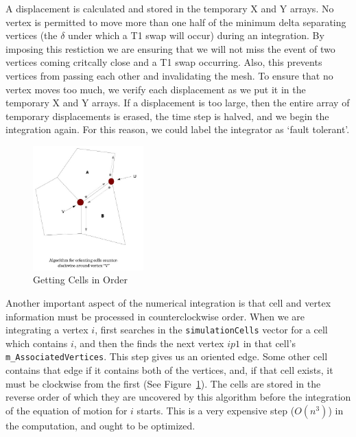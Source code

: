 A displacement is calculated and stored in the temporary X and Y arrays. No vertex is permitted to move more than one half of the minimum delta separating vertices (the $\delta$ under which a T1 swap will occur) during an integration. By imposing this restiction we are ensuring that we will not miss the event of two vertices coming critcally close and a T1 swap occurring. Also, this prevents vertices from passing each other and invalidating the mesh. To ensure that no vertex moves too much, we verify each displacement as we put it in the temporary X and Y arrays. If a displacement is too large, then the entire array of temporary displacements is erased, the time step is halved, and we begin the integration again. For this reason, we could label the integrator as `fault tolerant'.

\begin{figure}
\begin{center}
\includegraphics[width=0.38\textwidth]{../diagrams/counterclockwise.jpg}
\end{center}
\caption{Getting Cells in Order}
\label{fig:ctrclockwise}
\end{figure}

Another important aspect of the numerical integration is that cell and vertex information must be processed in counterclockwise order. When we are integrating a vertex $i$,  first searches in the \texttt{simulationCells} vector for a cell which contains $i$, and then the finds the next vertex $ip1$ in that cell's \texttt{m\_AssociatedVertices}. This step gives us an oriented edge. Some other cell contains that edge if it contains both of the vertices, and, if that cell exists, it must be clockwise from the first (See Figure~\ref{fig:ctrclockwise}). The cells are stored in the reverse order of which they are uncovered by this algorithm before the integration of the equation of motion for $i$ starts. This is a very expensive step ($O(n^3)$) in the computation, and ought to be optimized.

